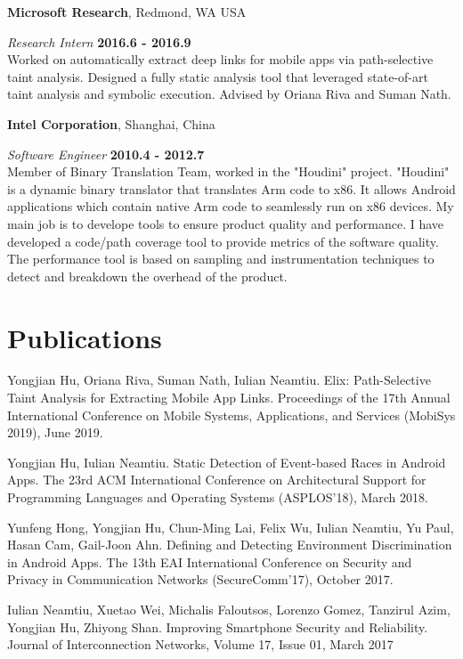 \documentclass[margin,line]{res}
\begin{document}
\begin{resume}
{\bf Microsoft Research}, Redmond, WA USA

\vspace{-.3cm}
{\em Research Intern} \hfill {\bf 2016.6 - 2016.9}\\
Worked on automatically extract deep links for mobile apps via path-selective taint analysis.
Designed a fully static analysis tool that leveraged state-of-art taint analysis and symbolic execution.
Advised by Oriana Riva and Suman Nath.

{\bf Intel Corporation}, Shanghai, China

\vspace{-.3cm}
{\em Software Engineer} \hfill {\bf 2010.4 - 2012.7}\\
Member of Binary Translation Team, worked in the "Houdini" project.
"Houdini" is a dynamic binary translator that translates Arm code to 
x86. It allows Android applications which contain native Arm code to 
seamlessly run on x86 devices. My main job is to develope tools to ensure 
product quality and performance. I have developed a code/path coverage 
tool to provide metrics of the software quality. The performance tool 
is based on sampling and instrumentation techniques to detect and 
breakdown the overhead of the product.


\section{\sc Publications}
Yongjian Hu, Oriana Riva, Suman Nath, Iulian Neamtiu.
Elix: Path-Selective Taint Analysis for Extracting Mobile App Links.
Proceedings of the 17th Annual International Conference on Mobile Systems, Applications, and Services (MobiSys 2019), June 2019.

Yongjian Hu, Iulian Neamtiu.
Static Detection of Event-based Races in Android Apps.
The 23rd ACM International Conference on Architectural Support for Programming Languages and Operating Systems (ASPLOS'18), March 2018.

Yunfeng Hong, Yongjian Hu, Chun-Ming Lai, Felix Wu, Iulian Neamtiu, Yu Paul, Hasan Cam, Gail-Joon Ahn.
Defining and Detecting Environment Discrimination in Android Apps.
The 13th EAI International Conference on Security and Privacy in Communication Networks (SecureComm'17), October 2017.

Iulian Neamtiu, Xuetao Wei, Michalis Faloutsos, Lorenzo Gomez, Tanzirul Azim, Yongjian Hu, Zhiyong Shan.
Improving Smartphone Security and Reliability.
Journal of Interconnection Networks, Volume 17, Issue 01, March 2017


\end{resume}
\end{document}
